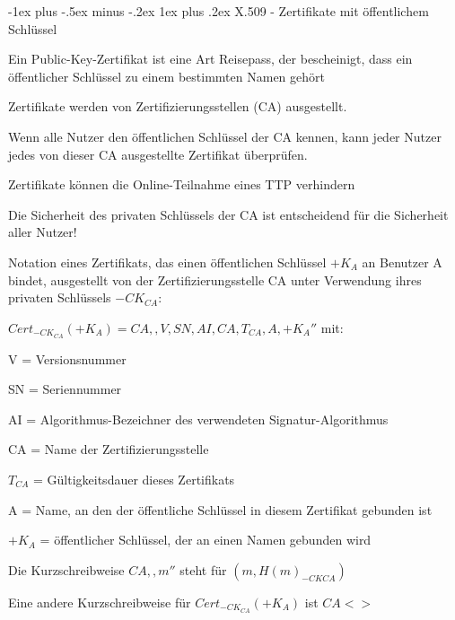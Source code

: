\documentclass[a4paper]{article}
\makeatletter
\renewcommand{\subsubsection}{\@startsection{subsubsection}{3}{0mm}%
 {-1ex plus -.5ex minus -.2ex}%
 {1ex plus .2ex}%
 {\normalfont\small\bfseries}}
\makeatother
\begin{document}
\begin{multicols}{3}
      \subsubsection{X.509 - Zertifikate mit öffentlichem Schlüssel}
      \begin{itemize*}
            \item Ein Public-Key-Zertifikat ist eine Art Reisepass, der bescheinigt, dass ein öffentlicher Schlüssel zu einem bestimmten Namen gehört
            \item Zertifikate werden von Zertifizierungsstellen (CA) ausgestellt.
            \item Wenn alle Nutzer den öffentlichen Schlüssel der CA kennen, kann jeder Nutzer jedes von dieser CA ausgestellte Zertifikat überprüfen.
            \item Zertifikate können die Online-Teilnahme eines TTP verhindern
            \item Die Sicherheit des privaten Schlüssels der CA ist entscheidend für die Sicherheit aller Nutzer!
            \item Notation eines Zertifikats, das einen öffentlichen Schlüssel $+K_A$ an Benutzer A bindet, ausgestellt von der Zertifizierungsstelle CA unter Verwendung ihres privaten Schlüssels $-CK_{CA}$:
            \begin{itemize*}
                  \item $Cert_{-CK_{CA}}(+K_A) = CA,,V, SN, AI, CA, T_{CA}, A, +K_A''$ mit:
                  \begin{itemize*}
                        \item V = Versionsnummer
                        \item SN = Seriennummer
                        \item AI = Algorithmus-Bezeichner des verwendeten Signatur-Algorithmus
                        \item CA = Name der Zertifizierungsstelle
                        \item $T_{CA}$ = Gültigkeitsdauer dieses Zertifikats
                        \item A = Name, an den der öffentliche Schlüssel in diesem Zertifikat gebunden ist
                        \item $+K_A$ = öffentlicher Schlüssel, der an einen Namen gebunden wird
                  \end{itemize*}
                  \item Die Kurzschreibweise $CA,,m''$ steht für $(m,{H(m)}_{{-CK}{CA}})$
                  \item Eine andere Kurzschreibweise für $Cert_{-CK_{CA}}(+K_A)$ ist $CA<>$
            \end{itemize*}
      \end{itemize*}


\end{multicols}
\end{document}
